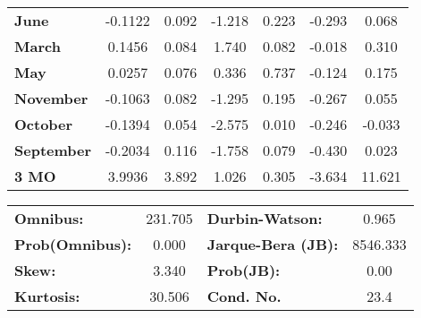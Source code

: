 \begin{center}
\begin{tabular}{lcccccc}
\textbf{June}      &      -0.1122  &        0.092     &    -1.218  &         0.223        &       -0.293    &        0.068     \\
\textbf{March}     &       0.1456  &        0.084     &     1.740  &         0.082        &       -0.018    &        0.310     \\
\textbf{May}       &       0.0257  &        0.076     &     0.336  &         0.737        &       -0.124    &        0.175     \\
\textbf{November}  &      -0.1063  &        0.082     &    -1.295  &         0.195        &       -0.267    &        0.055     \\
\textbf{October}   &      -0.1394  &        0.054     &    -2.575  &         0.010        &       -0.246    &       -0.033     \\
\textbf{September} &      -0.2034  &        0.116     &    -1.758  &         0.079        &       -0.430    &        0.023     \\
\textbf{3 MO}      &       3.9936  &        3.892     &     1.026  &         0.305        &       -3.634    &       11.621     \\
\bottomrule
\end{tabular}
\begin{tabular}{lclc}
\textbf{Omnibus:}       & 231.705 & \textbf{  Durbin-Watson:     } &    0.965  \\
\textbf{Prob(Omnibus):} &   0.000 & \textbf{  Jarque-Bera (JB):  } & 8546.333  \\
\textbf{Skew:}          &   3.340 & \textbf{  Prob(JB):          } &     0.00  \\
\textbf{Kurtosis:}      &  30.506 & \textbf{  Cond. No.          } &     23.4  \\
\bottomrule
\end{tabular}
\end{center}

